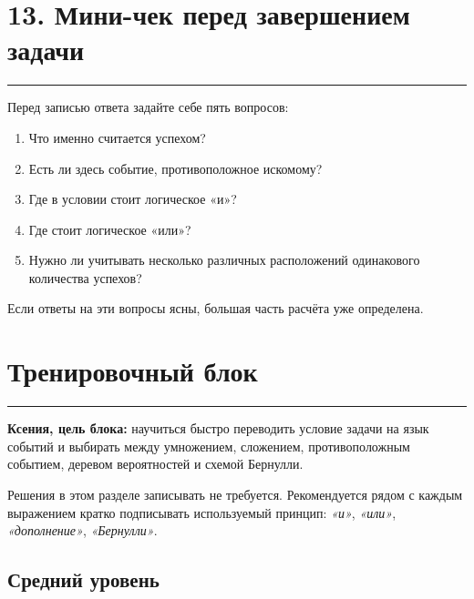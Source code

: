 \documentclass[a4paper,12pt]{article}
\newcommand{\accentline}{%
    \vspace{0.3em}
    {\color{accent}\rule{\linewidth}{0.7pt}}
    \vspace{0.5em}
}
\begin{document}

\section*{\color{darkaccent}13. Мини-чек перед завершением задачи}
\accentline

Перед записью ответа задайте себе пять вопросов:

\begin{enumerate}
    \item Что именно считается успехом?
    \item Есть ли здесь событие, противоположное искомому?
    \item Где в условии стоит логическое «и»?
    \item Где стоит логическое «или»?
    \item Нужно ли учитывать несколько различных расположений одинакового
    количества успехов?
\end{enumerate}

Если ответы на эти вопросы ясны, большая часть расчёта уже определена.


\clearpage

\section*{\color{darkaccent}Тренировочный блок}
\accentline

\textbf{Ксения, цель блока:}
научиться быстро переводить условие задачи на язык событий и выбирать
между умножением, сложением, противоположным событием, деревом
вероятностей и схемой Бернулли.

Решения в этом разделе записывать не требуется. Рекомендуется рядом с
каждым выражением кратко подписывать используемый принцип:
\textit{«и»}, \textit{«или»}, \textit{«дополнение»},
\textit{«Бернулли»}.

\subsection*{\color{darkaccent}Средний уровень}
\end{document}
